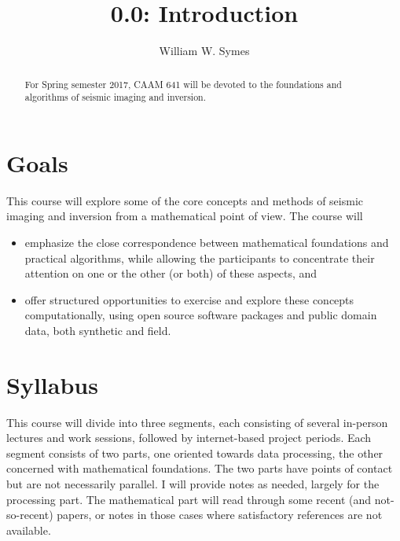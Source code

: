 \title{0.0: Introduction}
\author{William W. Symes}
\address{The Rice Inversion Project,
Rice University,
Houston TX 77251-1892 USA, email {\tt symes@caam.rice.edu}.}

\maketitle
\parskip 12pt


\begin{abstract}
For Spring semester 2017, CAAM 641 will be devoted to the foundations and algorithms of seismic imaging and inversion.
\end{abstract}

\section{Goals}
This course will explore some of the core concepts and methods of seismic imaging and inversion from a mathematical point of view. The course will

\begin{itemize}
\item emphasize the close correspondence between mathematical foundations and practical algorithms, while allowing the participants to concentrate their attention on one or the other (or both) of these aspects, and
\item offer structured opportunities to exercise and explore these concepts computationally, using open source software packages and public domain data, both synthetic and field.
\end{itemize}

\section{Syllabus}
This course will divide into three segments, each consisting of several in-person lectures and work sessions, followed by internet-based project periods. Each segment consists of two parts, one oriented towards data processing, the other concerned with mathematical foundations. The two parts have points of contact but are not necessarily parallel. I will provide notes as needed, largely for the processing part. The mathematical part will read through some recent (and not-so-recent) papers, or notes in those cases where satisfactory references are not available. 

